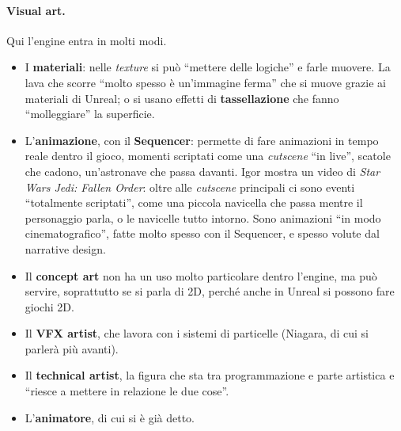 \paragraph{Visual art.} Qui l'engine entra in molti modi.
\begin{itemize}
  \item I \textbf{materiali}: nelle \emph{texture} si può ``mettere delle logiche'' e
        farle muovere. La lava che scorre ``molto spesso è un'immagine ferma'' che si
        muove grazie ai materiali di Unreal; o si usano effetti di
        \textbf{tassellazione} che fanno ``molleggiare'' la superficie.
  \item L'\textbf{animazione}, con il \textbf{Sequencer}: permette di fare animazioni in
        tempo reale dentro il gioco, momenti scriptati come una \emph{cutscene}
        ``in live'', scatole che cadono, un'astronave che passa davanti. Igor mostra un
        video di \emph{Star Wars Jedi: Fallen Order}: oltre alle \emph{cutscene}
        principali ci sono eventi ``totalmente scriptati'', come una piccola navicella
        che passa mentre il personaggio parla, o le navicelle tutto intorno.
        Sono animazioni ``in modo cinematografico'', fatte molto spesso con il
        Sequencer, e spesso volute dal narrative design.
  \item Il \textbf{concept art} non ha un uso molto particolare dentro l'engine, ma
        può servire, soprattutto se si parla di 2D, perché anche in Unreal si possono
        fare giochi 2D.
  \item Il \textbf{VFX artist}, che lavora con i sistemi di particelle (Niagara, di cui
        si parlerà più avanti).
  \item Il \textbf{technical artist}, la figura che sta tra programmazione e parte
        artistica e ``riesce a mettere in relazione le due cose''.
  \item L'\textbf{animatore}, di cui si è già detto.
\end{itemize}


